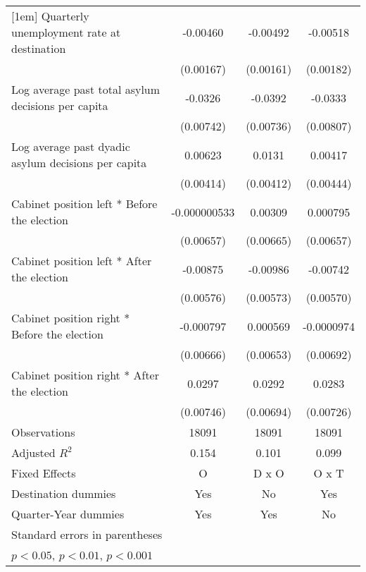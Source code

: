 \begin{table}[htbp]
\begin{tabular}{l*{3}{c}}
[1em]
Quarterly unemployment rate at destination&    -0.00460\sym{**} &    -0.00492\sym{**} &    -0.00518\sym{**} \\
                    &   (0.00167)         &   (0.00161)         &   (0.00182)         \\
[1em]
Log average past total asylum decisions per capita&     -0.0326\sym{***}&     -0.0392\sym{***}&     -0.0333\sym{***}\\
                    &   (0.00742)         &   (0.00736)         &   (0.00807)         \\
[1em]
Log average past dyadic asylum decisions per capita&     0.00623         &      0.0131\sym{**} &     0.00417         \\
                    &   (0.00414)         &   (0.00412)         &   (0.00444)         \\
[1em]
Cabinet position left * Before the election&-0.000000533         &     0.00309         &    0.000795         \\
                    &   (0.00657)         &   (0.00665)         &   (0.00657)         \\
[1em]
Cabinet position left * After the election&    -0.00875         &    -0.00986         &    -0.00742         \\
                    &   (0.00576)         &   (0.00573)         &   (0.00570)         \\
[1em]
Cabinet position right * Before the election&   -0.000797         &    0.000569         &  -0.0000974         \\
                    &   (0.00666)         &   (0.00653)         &   (0.00692)         \\
[1em]
Cabinet position right * After the election&      0.0297\sym{***}&      0.0292\sym{***}&      0.0283\sym{***}\\
                    &   (0.00746)         &   (0.00694)         &   (0.00726)         \\
\hline
Observations        &       18091         &       18091         &       18091         \\
Adjusted \(R^{2}\)  &       0.154         &       0.101         &       0.099         \\
Fixed Effects       &           O         &       D x O         &       O x T         \\
Destination dummies &         Yes         &          No         &         Yes         \\
Quarter-Year dummies&         Yes         &         Yes         &          No         \\
\hline\hline
\multicolumn{4}{l}{\footnotesize Standard errors in parentheses}\\
\multicolumn{4}{l}{\footnotesize \sym{*} \(p<0.05\), \sym{**} \(p<0.01\), \sym{***} \(p<0.001\)}\\
\end{tabular}
\end{table}
